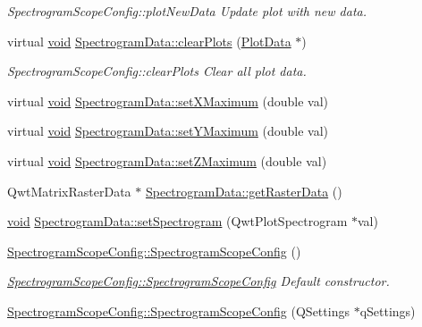 \begin{DoxyCompactItemize}
\begin{DoxyCompactList}\small\item\em \-Spectrogram\-Scope\-Config\-::plot\-New\-Data \-Update plot with new data. \end{DoxyCompactList}\item 
virtual \hyperlink{group___u_a_v_objects_plugin_ga444cf2ff3f0ecbe028adce838d373f5c}{void} \hyperlink{group___scope_plugin_ga3976392eaccf049644001f3e6c7596ad}{\-Spectrogram\-Data\-::clear\-Plots} (\hyperlink{class_plot_data}{\-Plot\-Data} $\ast$)
\begin{DoxyCompactList}\small\item\em \-Spectrogram\-Scope\-Config\-::clear\-Plots \-Clear all plot data. \end{DoxyCompactList}\item 
virtual \hyperlink{group___u_a_v_objects_plugin_ga444cf2ff3f0ecbe028adce838d373f5c}{void} \hyperlink{group___scope_plugin_ga47ae0c37eea393bc7c83907b6fceb173}{\-Spectrogram\-Data\-::set\-X\-Maximum} (double val)
\item 
virtual \hyperlink{group___u_a_v_objects_plugin_ga444cf2ff3f0ecbe028adce838d373f5c}{void} \hyperlink{group___scope_plugin_ga1379bb89fb91d5f6c894fbf000c65cae}{\-Spectrogram\-Data\-::set\-Y\-Maximum} (double val)
\item 
virtual \hyperlink{group___u_a_v_objects_plugin_ga444cf2ff3f0ecbe028adce838d373f5c}{void} \hyperlink{group___scope_plugin_ga90a7b5815000fba373fc23d13506ce5f}{\-Spectrogram\-Data\-::set\-Z\-Maximum} (double val)
\item 
\-Qwt\-Matrix\-Raster\-Data $\ast$ \hyperlink{group___scope_plugin_ga6373cb623e2b93290e6251c913a3330f}{\-Spectrogram\-Data\-::get\-Raster\-Data} ()
\item 
\hyperlink{group___u_a_v_objects_plugin_ga444cf2ff3f0ecbe028adce838d373f5c}{void} \hyperlink{group___scope_plugin_ga357b6fb785d9356c39fe80f5f1a7d88f}{\-Spectrogram\-Data\-::set\-Spectrogram} (\-Qwt\-Plot\-Spectrogram $\ast$val)
\item 
\hyperlink{group___scope_plugin_ga28b2d6eb7e9d8b459d67cef767b92fc5}{\-Spectrogram\-Scope\-Config\-::\-Spectrogram\-Scope\-Config} ()
\begin{DoxyCompactList}\small\item\em \hyperlink{group___scope_plugin_ga28b2d6eb7e9d8b459d67cef767b92fc5}{\-Spectrogram\-Scope\-Config\-::\-Spectrogram\-Scope\-Config} \-Default constructor. \end{DoxyCompactList}\item 
\hyperlink{group___scope_plugin_ga8acde1e8cd1057e318cdccaa2d2935b4}{\-Spectrogram\-Scope\-Config\-::\-Spectrogram\-Scope\-Config} (\-Q\-Settings $\ast$q\-Settings)

\end{DoxyCompactItemize}

